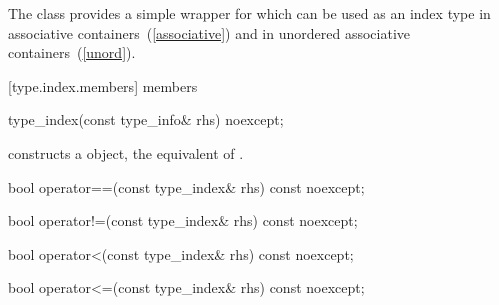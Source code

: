 \pnum
The class  provides a simple wrapper for
 which can be used as an index type in associative
containers~(\ref{associative}) and in unordered associative
containers~(\ref{unord}).

[type.index.members]{ members}

%
\begin{itemdecl}
type_index(const type_info& rhs) noexcept;
\end{itemdecl}

\begin{itemdescr}
\pnum
\effects constructs a  object, the equivalent of .
\end{itemdescr}

%
%
\begin{itemdecl}
bool operator==(const type_index& rhs) const noexcept;
\end{itemdecl}

\begin{itemdescr}
\pnum
\returns {}
\end{itemdescr}

%
%
\begin{itemdecl}
bool operator!=(const type_index& rhs) const noexcept;
\end{itemdecl}

\begin{itemdescr}
\pnum
\returns {}
\end{itemdescr}

%
%
\begin{itemdecl}
bool operator<(const type_index& rhs) const noexcept;
\end{itemdecl}

\begin{itemdescr}
\pnum
\returns {}
\end{itemdescr}

%
%
\begin{itemdecl}
bool operator<=(const type_index& rhs) const noexcept;
\end{itemdecl}

